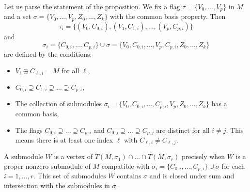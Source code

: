 \documentclass[a4paper]{amsart}
\numberwithin{theoremcounter}{section}
\theoremstyle{definition}
\theoremstyle{remark}
\begin{document}
Let us parse the statement of the proposition. We fix a flag $\tau=\{V_0, \dots,V_p\}$ in $M$ and a set $\sigma = \{V_0, \dots, V_p, Z_0, \dots, Z_k\}$ with the common basis property.  Then $$\tau_i = \{(V_0, C_{0,i}), (V_1, C_{1,i}), \dots, (V_p, C_{p,i})\}$$ and $$\sigma_i = \{C_{0,i} , \dots, C_{p,i}\} \cup \sigma = \{ V_0, C_{0,i} , \dots, V_p,  C_{p,i},Z_0, \dots, Z_k\}  $$ are defined by the conditions:
\begin{itemize}
\item $V_{\ell} \oplus C_{{\ell,i}} = M$ for all $\ell$,
\item $C_{0,i} \supseteq C_{1,i} \supseteq \dots \supseteq C_{p,i} $,
\item The collection of submodules $\sigma_i=\{ V_0, C_{0,i} , \dots, C_{p,i},V_p, Z_0, \dots, Z_k\} $ has a common basis,
\item The flags $C_{0,i} \supseteq \dots \supseteq C_{p,i} $ and $C_{0,j} \supseteq  \dots \supseteq C_{p,j} $ are distinct for all $i\neq j$. This means there is at least one index $\ell$ with $C_{\ell, i} \neq C_{\ell, j}$. 
\end{itemize} 
A submodule $W$ is a vertex of $T(M,\sigma_1) \cap \dots \cap T(M,\sigma_r) $ precisely when $W$ is a proper nonzero submodule of $M$ compatible with $\sigma_i =  \{C_{0,i} , \dots, C_{p,i}\} \cup \sigma$ for each $i=1, \dots, r$.  This set of submodules $W$ contains  $\sigma$ and is closed under sum and intersection with the submodules in $\sigma$. 
\end{document}
